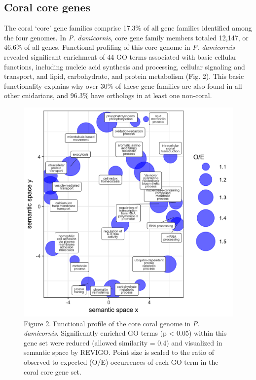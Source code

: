 \documentclass[]{elsarticle} %
\makeatletter
\def\maxwidth{\ifdim\Gin@nat@width>\linewidth\linewidth
\else\Gin@nat@width\fi}
\let\Oldincludegraphics\includegraphics
\renewcommand{\includegraphics}[1]{\Oldincludegraphics[width=\maxwidth]{#1}}
\makeatother
\begin{document}
\subsection{Coral core genes}\label{coral-core-genes}

The coral `core' gene families comprise 17.3\% of all gene families
identified among the four genomes. In \emph{P. damicornis}, core gene
family members totaled 12,147, or 46.6\% of all genes. Functional
profiling of this core genome in \emph{P. damicornis} revealed
significant enrichment of 44 GO terms associated with basic cellular
functions, including nucleic acid synthesis and processing, cellular
signaling and transport, and lipid, carbohydrate, and protein metabolism
(Fig. 2). This basic functionality explains why over 30\% of these gene
families are also found in all other cnidarians, and 96.3\% have
orthologs in at least one non-coral.

\begin{figure}
\centering
\includegraphics{../coral_core/coral_core_enriched_revigo.png}
\caption{Figure 2. Functional profile of the core coral genome in
\emph{P. damicornis}. Significantly enriched GO terms (p \textless{}
0.05) within this gene set were reduced (allowed similarity = 0.4) and
visualized in semantic space by REVIGO. Point size is scaled to the
ratio of observed to expected (O/E) occurrences of each GO term in the
coral core gene set.}
\end{figure}
\end{document}
